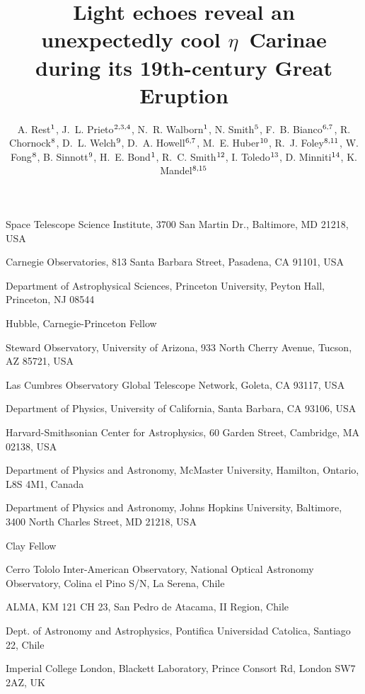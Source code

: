 \documentclass{natureastroph}
\title{Light echoes reveal an unexpectedly cool $\eta$~Carinae during its 19th-century Great Eruption}
\author{A. Rest$^{1}$, J.~L. Prieto$^{2,3,4}$,
N.~R. Walborn$^{1}$, N. Smith$^{5}$,
F.~B. Bianco$^{6,7}$, R. Chornock$^{8}$,
D.~L. Welch$^{9}$, D.~A. Howell$^{6,7}$,
M.~E. Huber$^{10}$, R.~J. Foley$^{8,11}$, W. Fong$^{8}$,
B. Sinnott$^{9}$, H.~E. Bond$^{1}$,
R.~C. Smith$^{12}$, I. Toledo$^{13}$, D. Minniti$^{14}$, K. Mandel$^{8,15}$}
\begin{document}
\ifastroph
\else
  \ifsuppl
  \else
     \large
  \fi
\fi

\maketitle

\begin{affiliations}
\item Space Telescope Science Institute, 3700 San Martin Dr., Baltimore, MD 21218, USA
\item Carnegie Observatories, 813 Santa Barbara Street, Pasadena, CA 91101, USA
\item Department of Astrophysical Sciences, Princeton University, Peyton Hall, Princeton, NJ 08544
\item Hubble, Carnegie-Princeton  Fellow
\item Steward Observatory, University of Arizona, 933 North Cherry Avenue, Tucson, AZ 85721, USA
\item Las Cumbres Observatory Global Telescope Network, Goleta, CA 93117, USA
\item Department of Physics, University of California, Santa Barbara, CA 93106, USA
\item Harvard-Smithsonian Center for Astrophysics, 60 Garden Street, Cambridge, MA 02138, USA
\item Department of Physics and Astronomy, McMaster University, Hamilton,  \ifastroph \else Ontario, \fi L8S 4M1, Canada
\item Department of Physics and Astronomy, Johns Hopkins University, Baltimore, 3400 North Charles Street, MD 21218, USA
\item Clay Fellow
\item Cerro Tololo Inter-American Observatory, National Optical Astronomy Observatory, Colina el Pino S/N, La Serena, Chile
\item ALMA, KM 121 CH 23, San Pedro de Atacama, II Region, Chile 
\item Dept. of Astronomy and Astrophysics, Pontifica Universidad Catolica, 
Santiago 22, Chile
\item Imperial College London, Blackett Laboratory,
Prince Consort Rd, London SW7 2AZ, UK
\end{affiliations}


\end{document}

